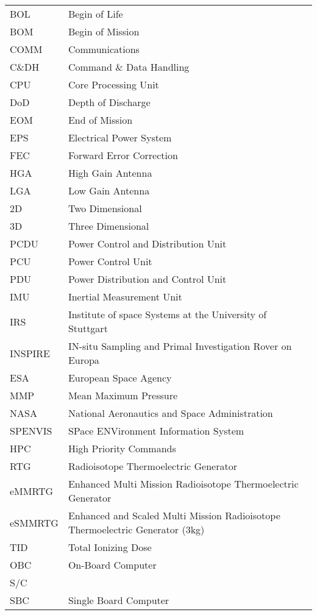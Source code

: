 
\begin{longtable}[l]{ll}


BOL     & Begin of Life \\
BOM     & Begin of Mission \\
COMM    & Communications \\
C\&DH	& Command \& Data Handling \\
CPU		& Core Processing Unit \\
DoD     & Depth of Discharge \\
EOM     & End of Mission \\
EPS     & Electrical Power System \\
FEC		& Forward Error Correction \\
HGA		& High Gain Antenna\\
LGA		& Low Gain Antenna\\		
2D		& Two Dimensional \\
3D		& Three Dimensional \\
PCDU    & Power Control and Distribution Unit \\
PCU     & Power Control Unit \\
PDU     & Power Distribution and Control Unit \\
IMU     & Inertial Measurement Unit \\
IRS     & Institute of space Systems at the University of Stuttgart \\
INSPIRE & IN-situ Sampling and Primal Investigation Rover on Europa \\
ESA		& European Space Agency	\\
MMP		& Mean Maximum Pressure \\
NASA    &   National Aeronautics and Space Administration \\
SPENVIS	&	SPace ENVironment Information System	\\
HPC     & High Priority Commands \\
RTG     & Radioisotope Thermoelectric Generator \\
eMMRTG  & Enhanced Multi Mission Radioisotope Thermoelectric Generator \\
eSMMRTG & Enhanced and Scaled Multi Mission Radioisotope Thermoelectric Generator (3kg) \\
TID		& Total Ionizing Dose \\
OBC		& On-Board Computer \\
S/C     \\
SBC		& Single Board Computer \\



\end{longtable}

